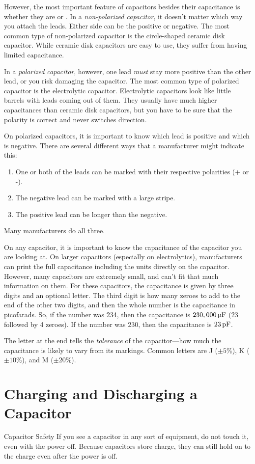 
However, the most important feature of capacitors besides their capacitance is whether they are  or .
In a \emph{non-polarized capacitor}, it doesn't matter which way you attach the leads.
Either side can be the positive or negative.
The most common type of non-polarized capacitor is the circle-shaped ceramic disk capacitor.
While ceramic disk capacitors are easy to use, they suffer from having limited capacitance.

In a \emph{polarized capacitor}, however, one lead \emph{must} stay more positive than the other lead, or you risk damaging the capacitor.
The most common type of polarized capacitor is the electrolytic capacitor.
Electrolytic capacitors look like little barrels with leads coming out of them.
They usually have much higher capacitances than ceramic disk capacitors, but you have to be sure that the polarity is correct and never switches direction.

On polarized capacitors, it is important to know which lead is positive and which is negative.  
There are several different ways that a manufacturer might indicate this:
\begin{enumerate}
\item One or both of the leads can be marked with their respective polarities (+ or -).
\item The negative lead can be marked with a large stripe.  
\item The positive lead can be longer than the negative.
\end{enumerate}
Many manufacturers do all three.

On any capacitor, it is important to know the capacitance of the capacitor you are looking at.
On larger capacitors (especially on electrolytics), manufacturers can print the full capacitance including the units directly on the capacitor.
However, many capacitors are extremely small, and can't fit that much information on them.
For these capacitors, the capacitance is given by three digits and an optional letter.
The third digit is how many zeroes to add to the end of the other two digits, and then the whole number is the capacitance in picofarads.
So, if the number was 234, then the capacitance is $230,000\mypf$ (23 followed by 4 zeroes).  
If the number was 230, then the capacitance is $23\mypf$.

The letter at the end tells the \emph{tolerance} of the capacitor---how much the capacitance is likely to vary from its markings.
Common letters are J ($\pm5\%$), K ($\pm10\%$), and M ($\pm20\%$).

\section{Charging and Discharging a Capacitor}


\begin{sidebar}{Capacitor Safety}
If you see a capacitor in any sort of equipment, do not touch it, even with the power off.
Because capacitors store charge, they can still hold on to the charge even after the power is off.
\end{sidebar}

